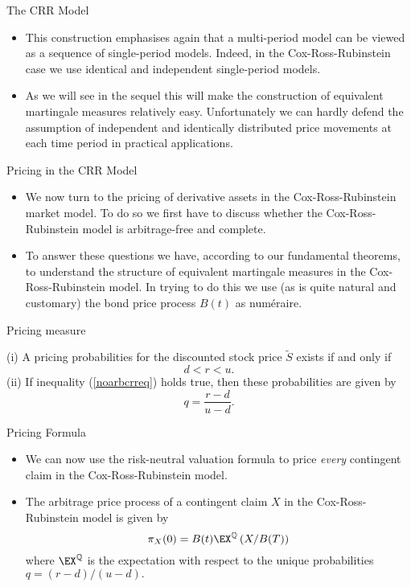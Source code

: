 { The CRR Model}

\begin{itemize}
  \item This construction emphasises again that a multi-period model can
be viewed as a sequence of single-period models. Indeed, in the
Cox-Ross-Rubinstein case we use identical and independent
single-period models.
\item As we will see in the sequel this will make
the construction of equivalent martingale measures relatively
easy. Unfortunately we can hardly defend the assumption of
independent and identically distributed price movements at each
time period in practical applications.
\end{itemize}


{Pricing in the CRR Model}

\begin{itemize}
  \item We now turn to the pricing of derivative assets in the
Cox-Ross-Rubinstein market model. To do so we first have to
discuss whether the Cox-Ross-Rubinstein model is arbitrage-free
and complete.
\item To answer these questions we have, according to our fundamental
theorems, to
understand the structure of equivalent martingale measures in the
Cox-Ross-Rubinstein model. In trying to do this we use (as is
quite natural and customary) the bond price process $B(t)$ as
num\'{e}raire.
\end{itemize}

{Pricing measure}

(i) A pricing probabilities for the discounted stock price
$\tilde{S}$ exists if and only if
\begin{equation}\label{noarbcrreq}
d < r < u.
\end{equation}
(ii) If inequality (\ref{noarbcrreq}) holds true, then these probabilities are given by
\begin{equation}\label{crrprob}
q=\frac{r-d}{u-d}.
\end{equation}

{Pricing Formula}

\begin{itemize}
  \item We can now use the risk-neutral valuation formula to price {\it
every} contingent claim in the Cox-Ross-Rubinstein model.
  \item The arbitrage price process of a contingent claim $X$ in the
Cox-Ross-Rubinstein model is given by
$$
\pi_X(0) = B(t) \EX^\mathbb{Q}\left( X/B(T)\right)
$$
where $\EX^\mathbb{Q}$ is the expectation with respect to the
unique probabilities
$q= (r-d)/(u-d).$
\end{itemize}


